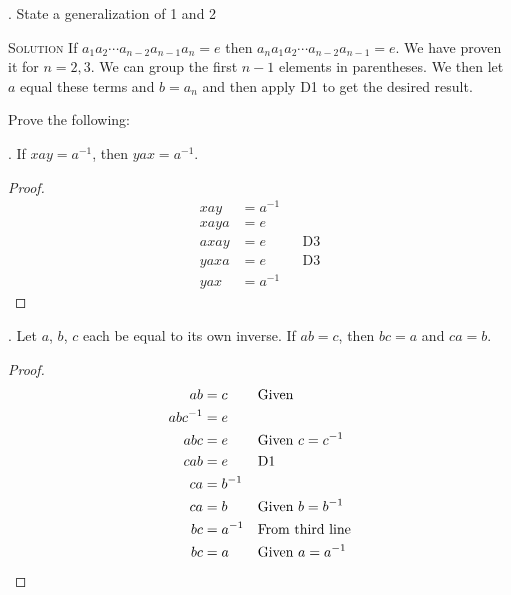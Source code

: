\documentclass[twoside]{amsart}
\newcommand{\Solution}{\textsc{Solution}\xspace}
\begin{document}
\begin{enumerate}[A.]
   . State a generalization of 1 and 2
   
   \noindent \Solution If $a_1 a_2 \cdots a_{n-2} a_{n-1} a_n=e$ then 
   $a_n a_1 a_2 \cdots a_{n-2} a_{n-1}=e$. We have proven it for
   $n=2,3$. We can group the first
   $n-1$ elements in parentheses. We then let $a$ equal these terms
   and $b=a_n$ and then apply D1 to get the desired
   result.

   \noindent Prove the following:

   . If $xay=a^{-1}$, then $yax=a^{-1}$.
   \begin{proof}
      \begin{align*}
         xay  & = a^{-1} \\
	 xaya & = e \\
	 axay & = e && \text{D3} \\
	 yaxa & = e && \text{D3} \\
	 yax  & = a^{-1}
      \end{align*}
   \end{proof}

   . Let $a$, $b$, $c$ each be equal to its own inverse.
   If $ab=c$, then $bc=a$ and $ca=b$.
   \begin{proof}
      \begin{align*}
         ab & = c    && \text{Given} \\
	 abc^{-1} & = e \\
	 abc      & = e && \text{Given $c=c^{-1}$} \\
	 cab      & = e && \text{D1}\\
	 ca       & = b^{-1} \\ 
	 ca       & = b  && \text{Given $b=b^{-1}$}\\
	 bc       & = a^{-1} && \text{From third line}\\
	 bc       & = a      && \text{Given $a=a^{-1}$} \qedhere
      \end{align*}
   \end{proof}

\end{enumerate}
\end{document}
